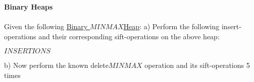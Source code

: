 \textbf{\LARGE{\color{tumgadRed}Binary Heaps}}\\
\\
\noindent
Given the following \href{https://sebastianoner.github.io/TUMGAD/src/DataStructures/PriorityQueues/BinaryHeaps/BinaryHeaps}{\underline{Binary $MINMAX$Heap}}:
a) Perform the following insert-operations and their corresponding sift-operations on the above heap:
\begin{center}
    $INSERTIONS$
\end{center}
b) Now perform the known delete$MINMAX$ operation and its sift-operations 5 times
